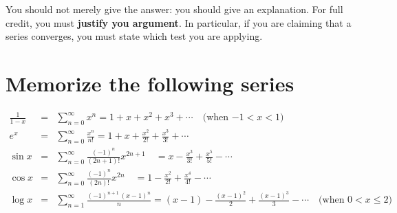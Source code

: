 \documentclass[12pt]{article}
\theoremstyle{definition}
\begin{document}
You should not merely give the answer: you should give an explanation.
For full credit, you must \textbf{justify you argument}.  In
particular, if you are claiming that a series converges, you must
state which test you are applying.

\section*{Memorize the following series}

\begin{eqnarray*}
\frac{1}{1-x} &=& \sum^{\infty}_{n=0} x^n = 1 + x + x^2 + x^3 + \cdots \hspace{1em}(\mbox{when $-1 < x < 1$)} \\
e^{x} &=& \sum^{\infty}_{n=0} \frac{x^n}{n!} = 1 + x + \frac{x^2}{2!} + \frac{x^3}{3!} + \cdots \\
\sin x &=& \sum^{\infty}_{n=0} \frac{(-1)^n}{(2n+1)!} x^{2n+1}\quad =  x - \frac{x^3}{3!} + \frac{x^5}{5!} - \cdots \\
\cos x &=& \sum^{\infty}_{n=0} \frac{(-1)^n}{(2n)!} x^{2n}\quad =  1 - \frac{x^2}{2!} + \frac{x^4}{4!} - \cdots \\
\log x &=& \sum_{n=1}^\infty \frac{(-1)^{n+1} \, (x-1)^n}{n} = (x-1) - \frac{(x-1)^2}{2} + \frac{(x-1)^3}{3} - \cdots \hspace{1em}\mbox{(when $0 < x \leq 2$)}
\end{eqnarray*}
\end{document}
